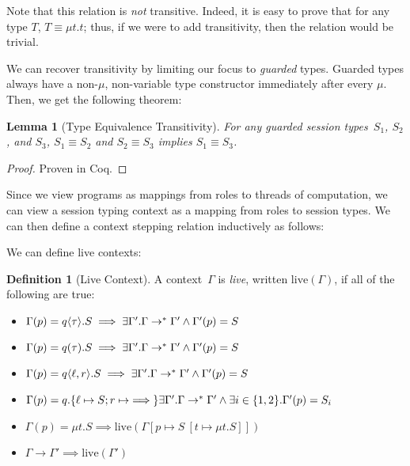 \documentclass{article}
\newtheorem{lem}{Lemma}
\theoremstyle{definition}
\newtheorem{defn}{Definition}
\newcommand{\subst}[3]{#1~[#2 \mapsto #3]}
\begin{document}
Note that this relation is \emph{not} transitive.
Indeed, it is easy to prove that for any type $T$, $T \equiv \mu t. t$; thus, if we were to add transitivity, then the relation would be trivial.

We can recover transitivity by limiting our focus to \emph{guarded} types.
Guarded types always have a non-$\mu$, non-variable type constructor immediately after every $\mu$.
Then, we get the following theorem:
\begin{lem}[Type Equivalence Transitivity]
  \label{lem:type-trans}
  For any guarded session types~$S_1$, $S_2$, and $S_3$, $S_1 \equiv S_2$ and $S_2 \equiv S_3$ implies $S_1 \equiv S_3$.
\end{lem}
\begin{proof}
  Proven in Coq.
\end{proof}

Since we view programs as mappings from roles to threads of computation, we can view a session typing context as a mapping from roles to session types.
We can then define a context stepping relation inductively as follows:

We can define live contexts:
\begin{defn}[Live Context]
  A context~$\Gamma$ is \emph{live}, written $\text{live}(\Gamma)$, if all of the following are true:
  \begin{itemize}
  \item $\Gamma(p) = q\langle\tau\rangle.S \implies \exists \Gamma'. \Gamma \to^\ast \Gamma' \land \Gamma'(p) = S$
  \item $\Gamma(p) = q(\tau).S \implies \exists \Gamma'. \Gamma \to^\ast \Gamma' \land \Gamma'(p) = S$
  \item $\Gamma(p) = q\langle\ell,r\rangle.S \implies \exists \Gamma'. \Gamma \to^\ast \Gamma' \land \Gamma'(p) = S$
  \item $\Gamma(p) = q.\{\ell \mapsto S ; r \mapsto \implies\} \exists \Gamma'. \Gamma \to^\ast \Gamma' \land \exists i \in \{1,2\}. \Gamma'(p) = S_i$
  \item $\Gamma(p) = \mu t.S \implies \text{live}(\Gamma[p \mapsto \subst{S}{t}{\mu t.S}])$
  \item $\Gamma \to \Gamma' \implies \text{live}(\Gamma')$
  \end{itemize}
\end{defn}
\end{document}
